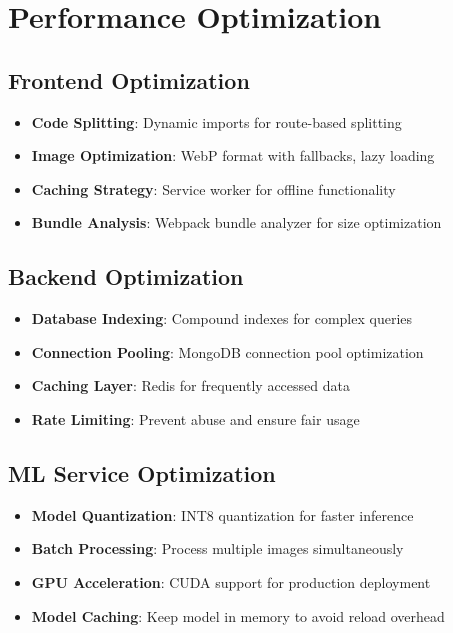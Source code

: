 \documentclass[12pt,a4paper]{article}
\begin{document}
\section{Performance Optimization}

\subsection{Frontend Optimization}

\begin{itemize}
    \item \textbf{Code Splitting}: Dynamic imports for route-based splitting
    \item \textbf{Image Optimization}: WebP format with fallbacks, lazy loading
    \item \textbf{Caching Strategy}: Service worker for offline functionality
    \item \textbf{Bundle Analysis}: Webpack bundle analyzer for size optimization
\end{itemize}

\subsection{Backend Optimization}

\begin{itemize}
    \item \textbf{Database Indexing}: Compound indexes for complex queries
    \item \textbf{Connection Pooling}: MongoDB connection pool optimization
    \item \textbf{Caching Layer}: Redis for frequently accessed data
    \item \textbf{Rate Limiting}: Prevent abuse and ensure fair usage
\end{itemize}

\subsection{ML Service Optimization}

\begin{itemize}
    \item \textbf{Model Quantization}: INT8 quantization for faster inference
    \item \textbf{Batch Processing}: Process multiple images simultaneously
    \item \textbf{GPU Acceleration}: CUDA support for production deployment
    \item \textbf{Model Caching}: Keep model in memory to avoid reload overhead
\end{itemize}
\end{document}
